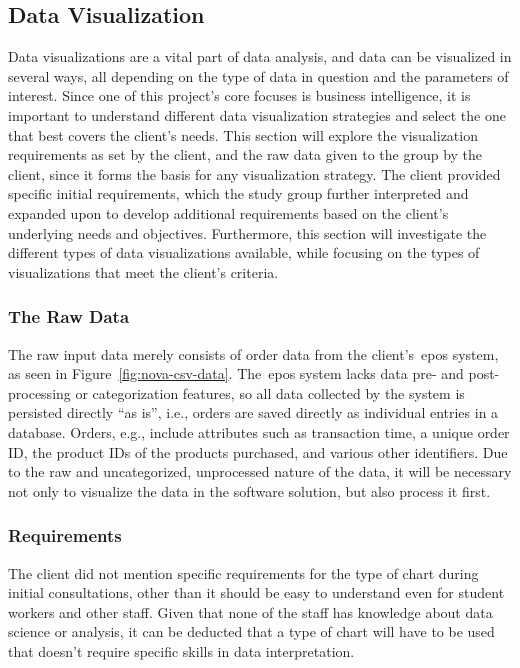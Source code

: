 \subsection{Data Visualization}\label{subsec:data-visualization}

Data visualizations are a vital part of data analysis, and data can be visualized in several ways, all depending on the
type of data in question and the parameters of interest.
Since one of this project's core focuses is business intelligence, it is important to understand different
data visualization strategies and select the one that best covers the client's needs.
This section will explore the visualization requirements as set by the client, and the raw data given to the group by
the client, since it forms the basis for any visualization strategy.
The client provided specific initial requirements, which the study group further interpreted and expanded upon to
develop additional requirements based on the client's underlying needs and objectives.
Furthermore, this section will investigate the different types of data visualizations available, while focusing on the
types of visualizations that meet the client's criteria.

\subsubsection{The Raw Data}\label{subsubsec:the-client's-raw-data}

The raw input data merely consists of order data from the client's~\acrshort{epos} system,
as seen in Figure~\ref{fig:nova-csv-data}.
The~\acrshort{epos} system lacks data pre- and post-processing or categorization features, so all data collected by the
system is persisted directly ``as is'', i.e., orders are saved directly as individual entries in a database.
Orders, e.g., include attributes such as transaction time, a unique order ID, the product IDs of the products purchased,
and various other identifiers.
Due to the raw and uncategorized, unprocessed nature of the data, it will be necessary not only to visualize the data in
the software solution, but also process it first.

\subsubsection{Requirements}\label{subsubsec:requirements}

The client did not mention specific requirements for the type of chart during initial consultations, other than it
should be easy to understand even for student workers and other staff.
Given that none of the staff has knowledge about data science or analysis, it can be deducted that a type of chart will
have to be used that doesn't require specific skills in data interpretation.

